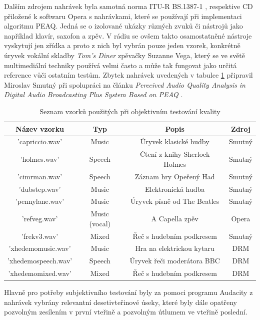 Dalším zdrojem nahrávek byla samotná norma ITU-R BS.1387-1 \cite{itur:1387}, respektive CD přiložené k softwaru Opera \cite{web:opticom} s nahrávkami, které se používají při implementaci algoritmu PEAQ. Jedná se o izolované ukázky různých zvuků či nástrojů jako například klavír, saxofon a zpěv. V rádiu se ovšem takto osamostatněné nástroje vyskytují jen zřídka a proto z nich byl vybrán pouze jeden vzorek, konkrétně úryvek vokální skladby \textit{Tom's Diner} zpěvačky Suzanne Vega, který se ve světě multimediální techniky používá velmi často a může tak fungovat jako určitá reference vůči ostatním testům.
Zbytek nahrávek uvedených v tabulce \ref{table:material} připravil Miroslav Smutný při spolupráci na článku \textit{Perceived Audio Quality Analysis in Digital Audio Broadcasting Plus System Based on PEAQ} \cite{article:ulovecsmutny}.

\begin{table}[h]
    \centering
    \begin{tabular}{|c|c|c|c|}
    \hline
    Název vzorku & Typ & Popis & Zdroj \\ \hline
    'capriccio.wav' & Music & Úryvek klasické hudby & Smutný \\ \hline
    'holmes.wav' & Speech & Čtení z knihy Sherlock Holmes & Smutný \\ \hline
    'cimrman.wav' & Speech & Záznam hry Opeřený Had & Smutný \\ \hline
    'dubstep.wav' & Music & Elektronická hudba & Smutný \\ \hline
    'pennylane.wav' & Music & Úryvek písně od The Beatles & Smutný \\ \hline
    'refveg.wav' & Music (vocal) & A Capella zpěv & Opera \\ \hline
    'frekv3.wav' & Mixed & Řeč s hudebním podkresem & Smutný \\ \hline
    'xhedemomusic.wav' & Music & Hra na elektrickou kytaru & DRM \\ \hline
    'xhedemospeech.wav' & Speech & Úryvek řeči moderátora BBC & DRM \\ \hline
    'xhedemomixed.wav' & Mixed & Řeč s hudebním podkresem & DRM \\ \hline
    \end{tabular}
    \caption{Seznam vzorků použitých při objektivním testování kvality}
    \label{table:material}
\end{table}

Hlavně pro potřeby subjektivního testování byly za pomoci programu Audacity z nahrávek vybrány relevantní desetivteřinové úseky, které byly dále opatřeny pozvolným zesílením v první vteřině a pozvolným útlumem ve vteřině poslední.

